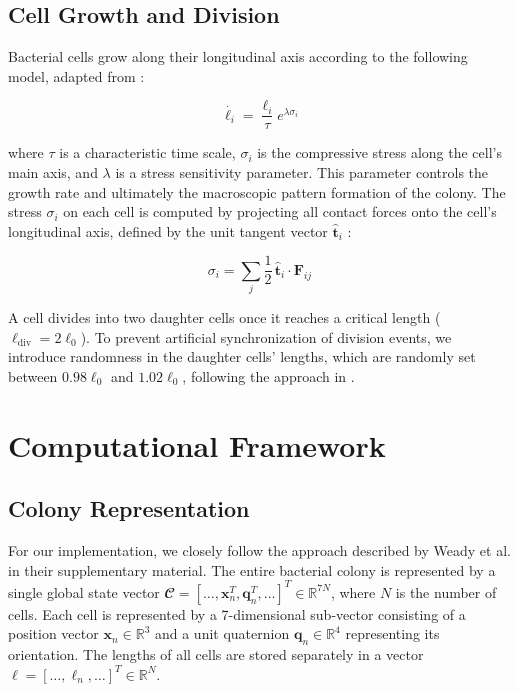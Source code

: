 \documentclass[conference]{IEEEtran}
\begin{document}
\subsection{Cell Growth and Division}

Bacterial cells grow along their longitudinal axis according to the following model, adapted from \cite{Weady2024}:

\begin{equation}
    \dot{{\ell_i}} = \frac{{\ell_i}}{\tau} e^{\lambda \sigma_i}
\end{equation}
\label{eq:growth}

where $\tau$ is a characteristic time scale, $\sigma_i$ is the compressive stress along the cell's main axis, and $\lambda$ is a stress sensitivity parameter. This parameter controls the growth rate and ultimately the macroscopic pattern formation of the colony. The stress $\sigma_i$ on each cell is computed by projecting all contact forces onto the cell's longitudinal axis, defined by the unit tangent vector $\hat{\mathbf{t}}_i$ \cite{Weady2024}:

\begin{equation}
    \sigma_i = \sum_{j} \frac{1}{2}\, \hat{\mathbf t}_i \cdot \mathbf F_{ij}
\end{equation}
\label{eq:stress}

A cell divides into two daughter cells once it reaches a critical length ($\ell_\text{div} = 2\ell_0$). To prevent artificial synchronization of division events, we introduce randomness in the daughter cells' lengths, which are randomly set between $0.98\ell_0$ and $1.02\ell_0$, following the approach in \cite{Khan_2024}.

\newpage

\section{Computational Framework}

\subsection{Colony Representation}

For our implementation, we closely follow the approach described by Weady et al. \cite{Weady2024} in their supplementary material. The entire bacterial colony is represented by a single global state vector $\mathbfcal{C} = [\dots, \mathbf{x}_n^T, \mathbf{q}_n^T, \dots]^T \in \mathbb{R}^{7N}$, where $N$ is the number of cells. Each cell is represented by a 7-dimensional sub-vector consisting of a position vector $\mathbf{x}_n \in \mathbb{R}^3$ and a unit quaternion $\mathbf{q}_n \in \mathbb{R}^4$ representing its orientation. The lengths of all cells are stored separately in a vector $\boldsymbol{\ell} = [\dots, \ell_n, \dots]^T \in \mathbb{R}^{N}$.
\end{document}
